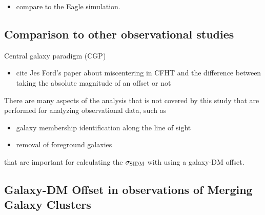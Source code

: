 \begin{itemize}
	\item compare to the Eagle simulation. 
\end{itemize}

\subsection{Comparison to other observational studies}
Central galaxy paradigm (CGP)
\begin{itemize}
		\item cite Jes Ford's paper about miscentering in CFHT and the difference between
			taking the absolute magnitude of an offset or not 
	\end{itemize}


There are many aspects of the analysis that is not covered by this study that
are performed for analyzing observational data, such as 

\begin{itemize}
		\item galaxy membership identification along the line of sight
		\item removal of foreground galaxies  
	\end{itemize}
	that are important for calculating the $\sigma_{\rm SIDM}$ with using a
	galaxy-DM offset. 


\subsection{Galaxy-DM Offset in observations of Merging Galaxy Clusters}

